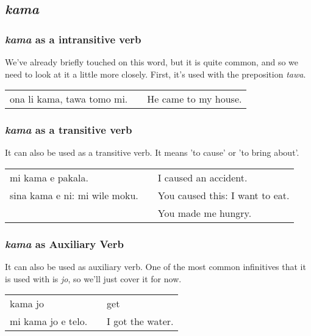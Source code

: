 \subsection*{\textit{kama}}
\subsubsection*{\textit{kama} as a intransitive verb}
%
We've already briefly touched on this word, but it is quite common, and so we need to look at it a little more closely. 
First, it's used with the preposition \textit{tawa}.

\begin{supertabular}{p{5,5cm}|ll}
ona li kama, tawa tomo mi. && He came to my house. \\
\end{supertabular} 
%
\subsubsection*{\textit{kama} as a transitive verb}
%
It can also be used as a transitive verb. 
It means 'to cause' or 'to bring about'.

\begin{supertabular}{p{5,5cm}|ll}
mi kama e pakala. && I caused an accident. \\
sina kama e ni: mi wile moku. && You caused this: I want to eat. \\ && You made me hungry. \\
\end{supertabular} 
%
\subsubsection*{\textit{kama} as Auxiliary Verb}
%
It can also be used as auxiliary verb. 
One of the most common infinitives that it is used with is \textit{jo}, so we'll just cover it for now. 

\begin{supertabular}{p{5,5cm}|ll}
kama jo && get \\
mi kama jo e telo. && I got the water. \\
\end{supertabular} 
%
